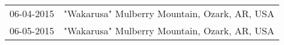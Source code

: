 \begin{supertabular}{ll}
 06-04-2015 &  "Wakarusa" Mulberry Mountain, Ozark, AR, USA \\
 06-05-2015 &  "Wakarusa" Mulberry Mountain, Ozark, AR, USA \\
\end{supertabular}
